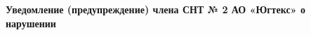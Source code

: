 \vspace{5mm}
\begin{center}
	\Large\textbf{Уведомление (предупреждение)
		члена СНТ № 2 АО «Югтекс» о нарушении }
\end{center}
\par
\vspace{5mm}





